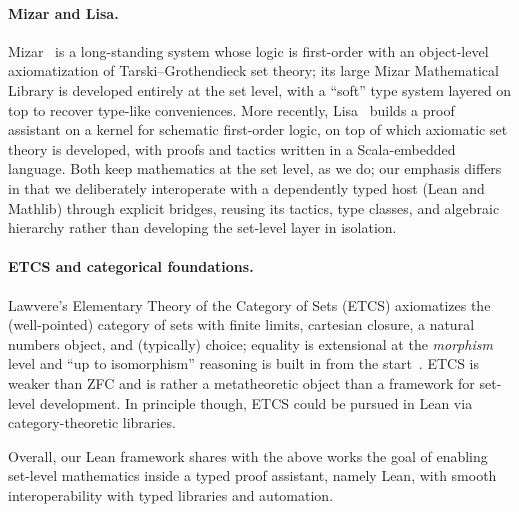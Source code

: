 \paragraph*{Mizar and Lisa.}
Mizar~\cite{mizar-sota} is a long-standing system whose logic is first-order with an object-level axiomatization of Tarski--Grothendieck set theory; its large Mizar Mathematical Library is developed entirely at the set level, with a ``soft'' type system layered on top to recover type-like conveniences.
More recently, Lisa~\cite{lisa-itp2023} builds a proof assistant on a kernel for schematic first-order logic, on top of which axiomatic set theory is developed, with proofs and tactics written in a Scala-embedded language.
Both keep mathematics at the set level, as we do; our emphasis differs in that we deliberately interoperate with a dependently typed host (Lean and Mathlib) through explicit bridges, reusing its tactics, type classes, and algebraic hierarchy rather than developing the set-level layer in isolation.

\paragraph*{ETCS and categorical foundations.}
Lawvere's Elementary Theory of the Category of Sets (ETCS) axiomatizes the (well-pointed) category of sets with finite limits, cartesian closure, a natural numbers object, and (typically) choice; equality is extensional at the \emph{morphism} level and ``up to isomorphism'' reasoning is built in from the start~\cite{lawvere-etcs}.
ETCS is weaker than ZFC and is rather a metatheoretic object than a framework for set-level development.
In principle though, ETCS could be pursued in Lean via category-theoretic libraries.

\medskip
Overall, our Lean framework shares with the above works the goal of enabling set-level mathematics inside a typed proof assistant, namely Lean, with smooth interoperability with typed libraries and automation.

